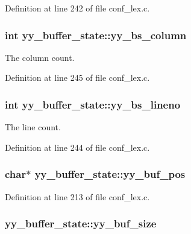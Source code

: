 Definition at line 242 of file conf\_\-lex.c.
\subsubsection[{yy\_\-bs\_\-column}]{\setlength{\rightskip}{0pt plus 5cm}int {\bf yy\_\-buffer\_\-state::yy\_\-bs\_\-column}}\label{structyy__buffer__state_10c4fcd8be759e6bf11e6d3e8cdb0307}


The column count. 

Definition at line 245 of file conf\_\-lex.c.
\subsubsection[{yy\_\-bs\_\-lineno}]{\setlength{\rightskip}{0pt plus 5cm}int {\bf yy\_\-buffer\_\-state::yy\_\-bs\_\-lineno}}\label{structyy__buffer__state_818e94bc9c766e683c60df1e9fd01199}


The line count. 

Definition at line 244 of file conf\_\-lex.c.
\subsubsection[{yy\_\-buf\_\-pos}]{\setlength{\rightskip}{0pt plus 5cm}char$\ast$ {\bf yy\_\-buffer\_\-state::yy\_\-buf\_\-pos}}\label{structyy__buffer__state_58aa927f098b99d99e75da80f9b681ef}




Definition at line 213 of file conf\_\-lex.c.
\subsubsection[{yy\_\-buf\_\-size}]{ {\bf yy\_\-buffer\_\-state::yy\_\-buf\_\-size}}\label{structyy__buffer__state_48302f5f3477a9c78bbddf56d356ef54}




